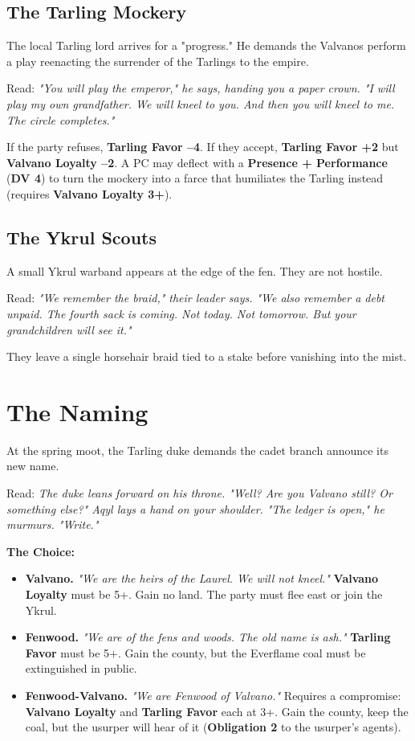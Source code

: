\documentclass[11pt]{book}
\begin{document}
\subsection*{The Tarling Mockery}
The local Tarling lord arrives for a "progress." He demands the Valvanos perform a play reenacting the surrender of the Tarlings to the empire.

Read:
\emph{"You will play the emperor," he says, handing you a paper crown. "I will play my own grandfather. We will kneel to you. And then you will kneel to me. The circle completes."}

If the party refuses, \textbf{Tarling Favor --4}. If they accept, \textbf{Tarling Favor +2} but \textbf{Valvano Loyalty --2}. A PC may deflect with a \textbf{Presence + Performance} (\textbf{DV 4}) to turn the mockery into a farce that humiliates the Tarling instead (requires \textbf{Valvano Loyalty 3+}).

\subsection*{The Ykrul Scouts}
A small Ykrul warband appears at the edge of the fen. They are not hostile.

Read:
\emph{"We remember the braid," their leader says. "We also remember a debt unpaid. The fourth sack is coming. Not today. Not tomorrow. But your grandchildren will see it."}

They leave a single horsehair braid tied to a stake before vanishing into the mist.

\section*{The Naming}
At the spring moot, the Tarling duke demands the cadet branch announce its new name.

Read:
\emph{The duke leans forward on his throne. "Well? Are you Valvano still? Or something else?" Aqyl lays a hand on your shoulder. "The ledger is open," he murmurs. "Write."}

\textbf{The Choice:}
\begin{itemize}
    \item \textbf{Valvano.} \textit{"We are the heirs of the Laurel. We will not kneel."} \textbf{Valvano Loyalty} must be 5+. Gain no land. The party must flee east or join the Ykrul.
    \item \textbf{Fenwood.} \textit{"We are of the fens and woods. The old name is ash."} \textbf{Tarling Favor} must be 5+. Gain the county, but the Everflame coal must be extinguished in public.
    \item \textbf{Fenwood-Valvano.} \textit{"We are Fenwood of Valvano."} Requires a compromise: \textbf{Valvano Loyalty} and \textbf{Tarling Favor} each at 3+. Gain the county, keep the coal, but the usurper will hear of it (\textbf{Obligation 2} to the usurper's agents).
\end{itemize}
\end{document}
